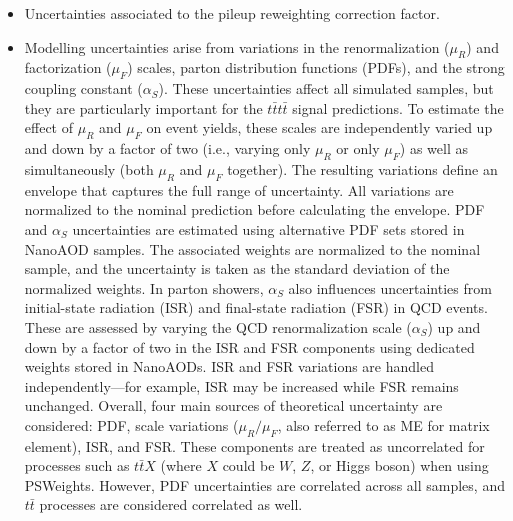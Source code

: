 \documentclass[twoside]{article}
\begin{document}
\begin{itemize}
    \item Uncertainties associated to the pileup reweighting correction factor.
    \item Modelling uncertainties arise from variations in the renormalization ($\mu_R$) and factorization ($\mu_F$) scales, parton distribution functions (PDFs), and the strong coupling constant ($\alpha_S$). These uncertainties affect all simulated samples, but they are particularly important for the $t\bar{t}t\bar{t}$ signal predictions. To estimate the effect of $\mu_R$ and $\mu_F$ on event yields, these scales are independently varied up and down by a factor of two (i.e., varying only $\mu_R$ or only $\mu_F$) as well as simultaneously (both $\mu_R$ and $\mu_F$ together). The resulting variations define an envelope that captures the full range of uncertainty. All variations are normalized to the nominal prediction before calculating the envelope. PDF and $\alpha_S$ uncertainties are estimated using alternative PDF sets stored in NanoAOD samples. The associated weights are normalized to the nominal sample, and the uncertainty is taken as the standard deviation of the normalized weights. In parton showers, $\alpha_S$ also influences uncertainties from initial-state radiation (ISR) and final-state radiation (FSR) in QCD events. These are assessed by varying the QCD renormalization scale ($\alpha_S$) up and down by a factor of two in the ISR and FSR components using dedicated weights stored in NanoAODs. ISR and FSR variations are handled independently—for example, ISR may be increased while FSR remains unchanged. Overall, four main sources of theoretical uncertainty are considered: PDF, scale variations ($\mu_R/\mu_F$, also referred to as ME for matrix element), ISR, and FSR. These components are treated as uncorrelated for processes such as $t\bar{t}X$ (where $X$ could be $W$, $Z$, or Higgs boson) when using PSWeights. However, PDF uncertainties are correlated across all samples, and $t\bar{t}$ processes are considered correlated as well. 


\end{itemize}
\end{document}
